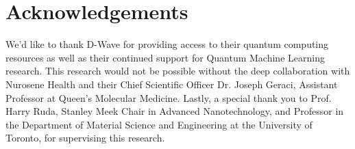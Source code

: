 \documentclass[%
 reprint,
 amsmath,amssymb,
 aps,
]{revtex4-2}
\begin{document}
\section*{Acknowledgements}
We'd like to thank D-Wave for providing access to their quantum computing resources as well as their continued support for Quantum Machine Learning research. This research would not be possible without the deep collaboration with Nurosene Health and their Chief Scientific Officer Dr. Joseph Geraci, Assistant Professor at Queen’s Molecular Medicine. Lastly, a special thank you to Prof. Harry Ruda, Stanley Meek Chair in Advanced Nanotechnology, and Professor in the Department of Material Science and Engineering at the University of Toronto, for supervising this research.

\end{document}
